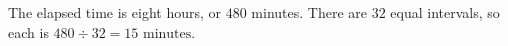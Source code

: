 The elapsed time is eight hours, or $ 480 $ minutes. There are $ 32 $ equal intervals, so each is $ 480\div32=\boxed{15\text{ minutes}}$.
